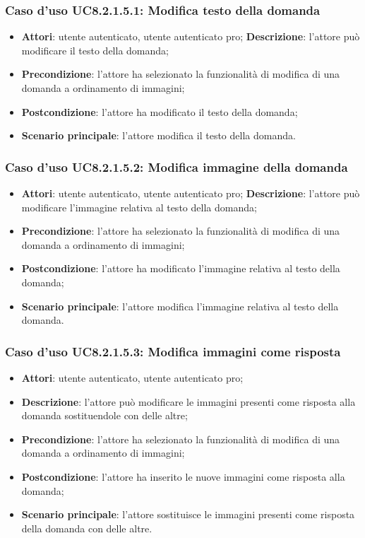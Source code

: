 \subsubsection{Caso d'uso UC8.2.1.5.1: Modifica testo della domanda}
\begin{itemize}
	\item\textbf{Attori}: utente autenticato, utente autenticato pro;
	\textbf{Descrizione}: l'attore può modificare il testo della domanda;
		\item
			\textbf{Precondizione}: l'attore ha selezionato la funzionalità di modifica di una domanda a ordinamento di immagini; 
		\item
			\textbf{Postcondizione}: l'attore ha modificato il testo della domanda;
		\item
			\textbf{Scenario principale}: l'attore modifica il testo della domanda.	
	\end{itemize}

\subsubsection{Caso d'uso UC8.2.1.5.2: Modifica immagine della domanda}
\begin{itemize}
	\item\textbf{Attori}: utente autenticato, utente autenticato pro;
	\textbf{Descrizione}: l'attore può modificare l'immagine relativa al testo della domanda;
		\item
			\textbf{Precondizione}: l'attore ha selezionato la funzionalità di modifica di una domanda a ordinamento di immagini; 
		\item
			\textbf{Postcondizione}: l'attore ha modificato l'immagine relativa al testo della domanda;
		\item
			\textbf{Scenario principale}: l'attore modifica l'immagine relativa al testo della domanda. 	
	\end{itemize}

\subsubsection{Caso d'uso UC8.2.1.5.3: Modifica immagini come risposta}
\begin{itemize}
	\item\textbf{Attori}: utente autenticato, utente autenticato pro;
	\item\textbf{Descrizione}: l'attore può modificare le immagini presenti come risposta alla domanda sostituendole con delle altre;
	\item\textbf{Precondizione}: l'attore ha selezionato la funzionalità di modifica di una domanda a ordinamento di immagini;
	\item \textbf{Postcondizione}: l'attore ha inserito le nuove immagini come risposta alla domanda;
	\item\textbf{Scenario principale}: l'attore sostituisce le immagini presenti come risposta della domanda con delle altre.
\end{itemize}

